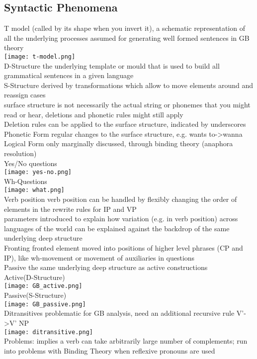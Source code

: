 \subsection*{Syntactic Phenomena}
\scriptsize{T model} {\tiny (called by its shape when you invert it), a schematic representation of all the underlying processes assumed for generating well formed sentences in GB theory
}\\
\texttt{[image: t-model.png]}\\
\scriptsize{D-Structure} {\tiny the underlying template or mould that is used to build all grammatical sentences in a given language}\\
\scriptsize{S-Structure} {\tiny derived by transformations which allow to move elements around and reassign cases\\
surface structure is not necessarily the actual string or phonemes that you might read or hear, deletions and phonetic rules might still apply}\\
\scriptsize{Deletion rules} {\tiny can be applied to the surface structure, indicated by underscores}\\
\scriptsize{Phonetic Form} {\tiny regular changes to the surface structure, e.g. wants to->wanna}\\
\scriptsize{Logical Form} {\tiny only marginally discussed, through binding theory (anaphora resolution)}\\
\scriptsize{Yes/No questions}\\
\texttt{[image: yes-no.png]}\\
\scriptsize{Wh-Questions}\\
\texttt{[image: what.png]}\\
\scriptsize{Verb position} {\tiny verb position can be handled by flexibly changing the order of elements in the rewrite rules for IP and VP}\\
\scriptsize{parameters} {\tiny introduced to explain how variation (e.g. in verb position) across languages of the world can be explained against the backdrop of the same underlying deep structure}\\
\scriptsize{Fronting} {\tiny fronted element moved into positions of higher level phrases (CP and IP), like wh-movement or movement of auxiliaries in questions}\\
\scriptsize{Passive} {\tiny the same underlying deep structure as active constructions}\\
\scriptsize{Active(D-Structure)}\\
\texttt{[image: GB\_active.png]}\\
\scriptsize{Passive(S-Structure)}\\
\texttt{[image: GB\_passive.png]}\\
\scriptsize{Ditransitives} {\tiny problematic for GB analysis, need an additional recursive rule V'->V' NP\\
\texttt{[image: ditransitive.png]}\\
Problems: implies a verb can take arbitrarily large number of complements; run into problems with Binding Theory when reflexive pronouns are used}
